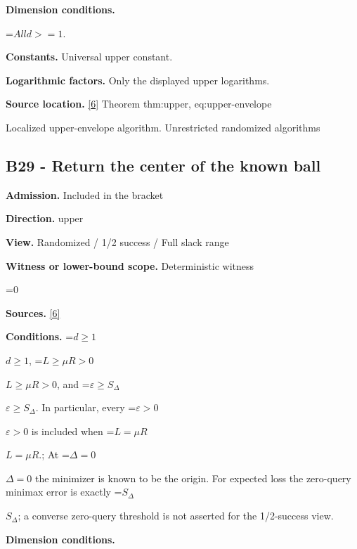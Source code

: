 \documentclass[10pt,a4paper]{article}
\newcommand{\AtlasMath}[1]{\par\begingroup\centering\setbox0=\hbox{$\displaystyle #1$}\ifdim\wd0>1.4\linewidth\typeout{ATLAS WIDE FORMULA: \the\wd0}\fi\ifdim\wd0>\linewidth\resizebox{\linewidth}{!}{\box0}\else\box0\fi\par\endgroup}
\newcommand{\AtlasInlineMath}[1]{\begingroup\setbox0=\hbox{$#1$}\ifdim\wd0>.4\linewidth\endgroup\AtlasMath{#1}\else\endgroup$#1$\fi}
\begin{document}
\textbf{Dimension conditions.}



\AtlasMath{All d>=1.}


\textbf{Constants.} Universal upper constant.



\textbf{Logarithmic factors.} Only the displayed upper logarithms.



\textbf{Source location.} \href{https://github.com/WU-Wendao/Colombo/blob/main/colombo_sensorium/Complexity_altas/data/sources/colombo/U10/manuscript.pdf}{[6]} Theorem thm:upper, eq:upper-envelope



Localized upper-envelope algorithm. Unrestricted randomized algorithms



\subsection{B29 - Return the center of the known ball}


\textbf{Admission.} Included in the bracket



\textbf{Direction.} upper



\textbf{View.} Randomized / 1/2 success / Full slack range



\textbf{Witness or lower-bound scope.} Deterministic witness



\AtlasMath{0}


\textbf{Sources.} \href{https://github.com/WU-Wendao/Colombo/blob/main/colombo_sensorium/Complexity_altas/data/sources/colombo/U10/manuscript.pdf}{[6]}



\textbf{Conditions.} \AtlasInlineMath{d\ge1}, \AtlasInlineMath{L\ge\mu R>0}, and \AtlasInlineMath{\varepsilon\ge S_\Delta}. In particular, every \AtlasInlineMath{\varepsilon>0} is included when \AtlasInlineMath{L=\mu R}.; At \AtlasInlineMath{\Delta=0} the minimizer is known to be the origin. For expected loss the zero-query minimax error is exactly \AtlasInlineMath{S_\Delta}; a converse zero-query threshold is not asserted for the 1/2-success view.



\textbf{Dimension conditions.}
\end{document}
